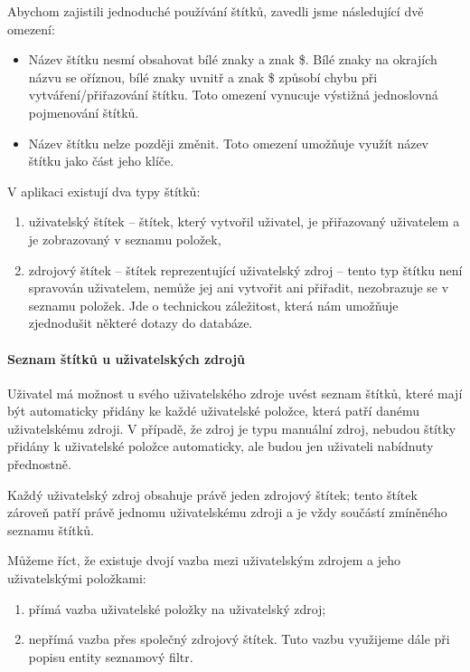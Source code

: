 Abychom zajistili jednoduché používání štítků, zavedli jsme následující dvě omezení:
\begin{itemize}
	\item Název štítku nesmí obsahovat bílé znaky a znak \$.
		Bílé znaky na okrajích názvu se oříznou, bílé znaky uvnitř a znak \$ způsobí chybu při vytváření/přiřazování štítku.
		Toto omezení vynucuje výstižná jednoslovná pojmenování štítků.
	\item Název štítku nelze později změnit.
		Toto omezení umožňuje využít název štítku jako část jeho klíče.
\end{itemize}

V aplikaci existují dva typy štítků:
\begin{enumerate}
	\item uživatelský štítek -- štítek, který vytvořil uživatel, je přiřazovaný uživatelem a je zobrazovaný v seznamu položek,
	\item zdrojový štítek -- štítek reprezentující uživatelský zdroj -- tento typ štítku není spravován uživatelem, nemůže jej ani vytvořit ani přiřadit, nezobrazuje se v seznamu položek.
		Jde o technickou záležitost, která nám umožňuje zjednodušit některé dotazy do databáze.
\end{enumerate}

\paragraph{Seznam štítků u uživatelských zdrojů}
Uživatel má možnost u svého uživatelského zdroje uvést seznam štítků, které mají být automaticky přidány ke každé uživatelské položce, která patří danému uživatelskému zdroji.
V případě, že zdroj je typu manuální zdroj, nebudou štítky přidány k uživatelské položce automaticky, ale budou jen uživateli nabídnuty přednostně.

Každý uživatelský zdroj obsahuje právě jeden zdrojový štítek; tento štítek zároveň patří právě jednomu uživatelskému zdroji a je vždy součástí zmíněného seznamu štítků.

Můžeme říct, že existuje dvojí vazba mezi uživatelským zdrojem a jeho uživatelskými položkami:
\begin{enumerate}
	\item přímá vazba uživatelské položky na uživatelský zdroj;
	\item nepřímá vazba přes společný zdrojový štítek.
		Tuto vazbu využijeme dále při popisu entity seznamový filtr.
\end{enumerate}

